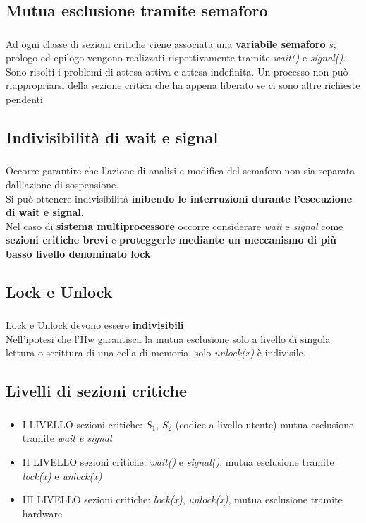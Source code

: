 \documentclass{beamer}
\newenvironment{mainframe}{
	\begin{frame}
		\frametitle{\insertsubsection}
		\framesubtitle{\insertsection}
	}{
	\end{frame}
}
\begin{document}
\subsection{Mutua esclusione tramite semaforo}
\begin{mainframe}
	Ad ogni classe di sezioni critiche viene associata una \textbf{variabile semaforo} $s$; prologo ed epilogo vengono realizzati rispettivamente tramite \textit{wait()} e \textit{signal()}.\\
	Sono risolti i problemi di attesa attiva e attesa indefinita. Un processo non può riappropriarsi della sezione critica che ha appena liberato se ci sono altre richieste pendenti
\end{mainframe}
\subsection{Indivisibilità di wait e signal}
\begin{mainframe}
	Occorre garantire che l'azione di analisi e modifica del semaforo non sia separata dall'azione di sospensione.\\
	Si può ottenere indivisibilità \textbf{inibendo le interruzioni durante l'esecuzione di wait e signal}.\\
	Nel caso di \textbf{sistema multiprocessore} occorre considerare \textit{wait} e \textit{signal} come \textbf{sezioni critiche brevi} e \textbf{proteggerle mediante un meccanismo di più basso livello denominato lock}
\end{mainframe}
\subsection{Lock e Unlock}
\begin{mainframe}
	Lock e Unlock devono essere \textbf{indivisibili}\\
	Nell'ipotesi che l'Hw garantisca la mutua esclusione solo a livello di singola lettura o scrittura di una cella di memoria, solo \textit{unlock(x)} è indivisile.
\end{mainframe}
\subsection{Livelli di sezioni critiche}
\begin{mainframe}
	\begin{itemize}
		\item I LIVELLO sezioni critiche: $S_1$, $S_2$ (codice a livello utente) mutua esclusione tramite \textit{wait e signal}
		\item II LIVELLO sezioni critiche: \textit{wait()} e \textit{signal()}, mutua esclusione tramite \textit{lock(x)} e \textit{unlock(x)}
		\item III LIVELLO sezioni critiche: \textit{lock(x)}, \textit{unlock(x)}, mutua esclusione tramite hardware
	\end{itemize}
\end{mainframe}
\end{document}
